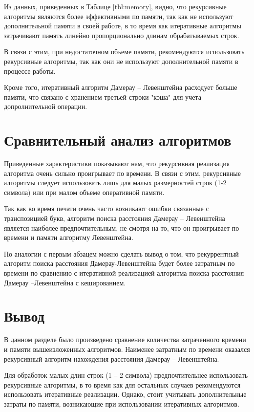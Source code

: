 Из данных, приведенных в Таблице \ref{tbl:memory}, видно, что рекурсивные алгоритмы являются более эффективными по памяти, так как не используют дополнительной памяти в своей работе, в то время как итеративные алгоритмы затрачивают память линейно пропорционально длинам обрабатываемых строк.

В связи с этим, при недостаточном объеме памяти, рекомендуются использовать рекурсивные алгоритмы, так как они не используют дополнительной памяти в процессе работы.

Кроме того, итеративный алгоритм Дамерау -- Левенштейна расходует больше памяти, что связано с хранением третьей строки "кэша" для учета допролнительной операции.

\section{Сравнительный анализ алгоритмов}

Приведенные характеристики показывают нам, что рекурсивная реализация алгоритма очень сильно проигрывает по времени. В связи с этим, рекурсивные алгоритмы следует использовать лишь для малых размерностей строк (1-2 символа) или при малом объеме оперативной памяти.

Так как во время печати очень часто возникают ошибки связанные с транспозицией букв, алгоритм поиска расстояния Дамерау -- Левенштейна является наиболее предпочтительным, не смотря на то, что он проигрывает по времени и памяти алгоритму Левенштейна. 

По аналогии с первым абзацем можно сделать вывод о том, что рекуррентный алгоритм поиска расстояния Дамерау-Левенштейна будет более затратным по времени по сравнению с итеративной реализацией алгоритма поиска расстояния Дамерау --Левенштейна с кешированием.

\section{Вывод}

В данном разделе было произведено сравнение количества затраченного времени и памяти вышеизложенных алгоритмов. Наименее затратным по времени оказался рекурсивный алгоритм нахождения расстояния Дамерау -- Левенштейна.

Для обработок малых длин строк (1 -- 2 символа) предпочтительнее использовать рекурсивные алгоритмы, в то время как для остальных случаев рекомендуются использовать итеративные реализации. Однако, стоит учитывать дополнительные затраты по памяти, возникающие при использовании итеративных алгоритмов.
